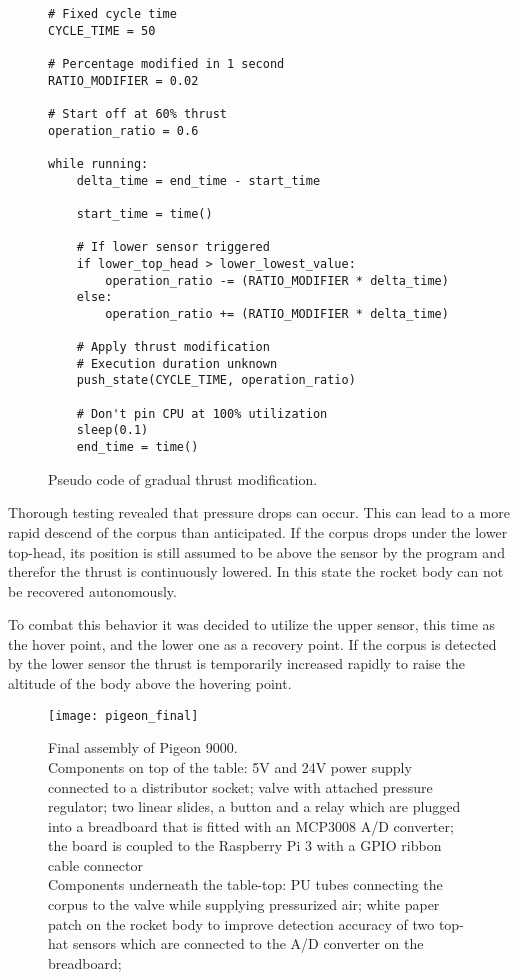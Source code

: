 \begin{figure}[h]
\begin{verbatim}
# Fixed cycle time
CYCLE_TIME = 50

# Percentage modified in 1 second
RATIO_MODIFIER = 0.02

# Start off at 60% thrust
operation_ratio = 0.6

while running:
    delta_time = end_time - start_time
    
    start_time = time()

    # If lower sensor triggered
    if lower_top_head > lower_lowest_value:
        operation_ratio -= (RATIO_MODIFIER * delta_time)
    else:
        operation_ratio += (RATIO_MODIFIER * delta_time)

    # Apply thrust modification
    # Execution duration unknown
    push_state(CYCLE_TIME, operation_ratio)

    # Don't pin CPU at 100% utilization
    sleep(0.1)
    end_time = time()
\end{verbatim}
\caption{Pseudo code of gradual thrust modification.}
\end{figure}

Thorough testing revealed that pressure drops can occur. This can lead to a more rapid descend of the corpus than anticipated. If the corpus drops under the lower top-head, its position is still assumed to be above the sensor by the program and therefor the thrust is continuously lowered. In this state the rocket body can not be recovered autonomously. 

To combat this behavior it was decided to utilize the upper sensor, this time as the hover point, and the lower one as a recovery point. If the corpus is detected by the lower sensor the thrust is temporarily increased rapidly to raise the altitude of the body above the hovering point. 

\begin{figure}[hhtb]

\texttt{[image: pigeon\_final]}

\caption{Final assembly of Pigeon 9000. \\
Components on top of the table: 5V and 24V power supply connected to a distributor socket; valve with attached pressure regulator; two linear slides, a button and a relay which are plugged into a breadboard that is fitted with an MCP3008 A/D converter; the board is coupled to the Raspberry Pi 3 with a GPIO ribbon cable connector \\
Components underneath the table-top: PU tubes connecting the corpus to the valve while supplying pressurized air; white paper patch on the rocket body to improve detection accuracy of two top-hat sensors which are connected to the A/D converter on the breadboard;}
\end{figure}